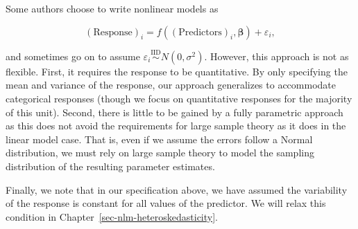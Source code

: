 \documentclass[
  letterpaper,
  DIV=11,
  numbers=noendperiod]{scrreprt}
\theoremstyle{definition}
\theoremstyle{definition}
\theoremstyle{remark}
\begin{document}
\begin{tcolorbox}[enhanced jigsaw, left=2mm, toprule=.15mm, arc=.35mm, breakable, opacitybacktitle=0.6, opacityback=0, rightrule=.15mm, colbacktitle=quarto-callout-note-color!10!white, coltitle=black, leftrule=.75mm, toptitle=1mm, colframe=quarto-callout-note-color-frame, titlerule=0mm, title=\textcolor{quarto-callout-note-color}{\faInfo}\hspace{0.5em}{Note}, bottomrule=.15mm, colback=white, bottomtitle=1mm]

Some authors choose to write nonlinear models as

\[(\text{Response})_i = f\left((\text{Predictors})_i, \boldsymbol{\beta}\right) + \varepsilon_i,\]

and sometimes go on to assume
\(\varepsilon_i \stackrel{\text{IID}}{\sim} N\left(0, \sigma^2\right)\).
However, this approach is not as flexible. First, it requires the
response to be quantitative. By only specifying the mean and variance of
the response, our approach generalizes to accommodate categorical
responses (though we focus on quantitative responses for the majority of
this unit). Second, there is little to be gained by a fully parametric
approach as this does not avoid the requirements for large sample theory
as it does in the linear model case. That is, even if we assume the
errors follow a Normal distribution, we must rely on large sample theory
to model the sampling distribution of the resulting parameter estimates.

\end{tcolorbox}

Finally, we note that in our specification above, we have assumed the
variability of the response is constant for all values of the predictor.
We will relax this condition in
Chapter~\ref{sec-nlm-heteroskedasticity}.
\end{document}
